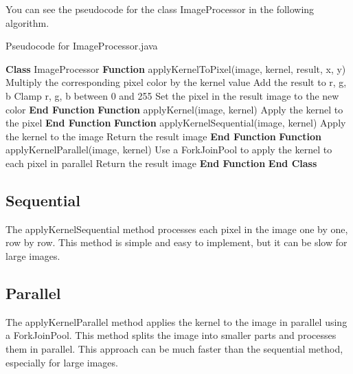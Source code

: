 \documentclass{article}
\begin{document}
\begin{multicols}{2}
    You can see the pseudocode for the class ImageProcessor in the following algorithm.

    \begin{algorithm}[H]
        \caption{Pseudocode for ImageProcessor.java}
        \begin{algorithmic}[1]
            \State \textbf{Class} ImageProcessor
            \State \textbf{Function} applyKernelToPixel(image, kernel, result, x, y)
            \State Multiply the corresponding pixel color by the kernel value
            \State Add the result to r, g, b
            \EndFor
            \State Clamp r, g, b between 0 and 255
            \State Set the pixel in the result image to the new color
            \State \textbf{End Function}
            \State
            \State \textbf{Function} applyKernel(image, kernel)
            \State Apply the kernel to the pixel
            \EndFor
            \State \textbf{End Function}
            \State
            \State \textbf{Function} applyKernelSequential(image, kernel)
            \State Apply the kernel to the image
            \State Return the result image
            \State \textbf{End Function}
            \State
            \State \textbf{Function} applyKernelParallel(image, kernel)
            \State Use a ForkJoinPool to apply the kernel to each pixel in parallel
            \State Return the result image
            \State \textbf{End Function}
            \State \textbf{End Class}
        \end{algorithmic}
    \end{algorithm}

    \subsection{Sequential}

    The applyKernelSequential method processes each pixel in the image one by one, row by row. This method is simple and easy to implement, but it can be slow for large images.

    \subsection{Parallel}

    The applyKernelParallel method applies the kernel to the image in parallel using a ForkJoinPool. This method splits the image into smaller parts and processes them in parallel. This approach can be much faster than the sequential method, especially for large images.


\end{multicols}
\end{document}
